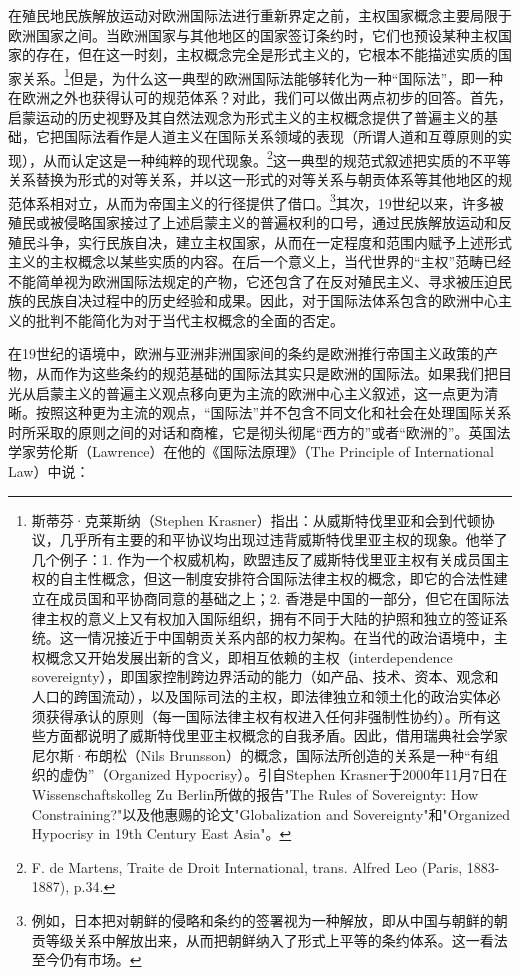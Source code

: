 \documentclass[a4paper, 12pt, openright]{ctexbook}
\begin{document}
在殖民地民族解放运动对欧洲国际法进行重新界定之前，主权国家概念主要局限于欧洲国家之间。当欧洲国家与其他地区的国家签订条约时，它们也预设某种主权国家的存在，但在这一时刻，主权概念完全是形式主义的，它根本不能描述实质的国家关系。\footnote{斯蒂芬·克莱斯纳（Stephen Krasner）指出：从威斯特伐里亚和会到代顿协议，几乎所有主要的和平协议均出现过违背威斯特伐里亚主权的现象。他举了几个例子：1. 作为一个权威机构，欧盟违反了威斯特伐里亚主权有关成员国主权的自主性概念，但这一制度安排符合国际法律主权的概念，即它的合法性建立在成员国和平协商同意的基础之上；2. 香港是中国的一部分，但它在国际法律主权的意义上又有权加入国际组织，拥有不同于大陆的护照和独立的签证系统。这一情况接近于中国朝贡关系内部的权力架构。在当代的政治语境中，主权概念又开始发展出新的含义，即相互依赖的主权（interdependence sovereignty），即国家控制跨边界活动的能力（如产品、技术、资本、观念和人口的跨国流动），以及国际司法的主权，即法律独立和领土化的政治实体必须获得承认的原则（每一国际法律主权有权进入任何非强制性协约）。所有这些方面都说明了威斯特伐里亚主权概念的自我矛盾。因此，借用瑞典社会学家尼尔斯·布朗松（Nils Brunsson）的概念，国际法所创造的关系是一种“有组织的虚伪”（Organized Hypocrisy）。引自Stephen Krasner于2000年11月7日在Wissenschaftskolleg Zu Berlin所做的报告"The Rules of Sovereignty: How Constraining?"以及他惠赐的论文"Globalization and Sovereignty"和"Organized Hypocrisy in 19th Century East Asia"。}但是，为什么这一典型的欧洲国际法能够转化为一种“国际法”，即一种在欧洲之外也获得认可的规范体系？对此，我们可以做出两点初步的回答。首先，启蒙运动的历史视野及其自然法观念为形式主义的主权概念提供了普遍主义的基础，它把国际法看作是人道主义在国际关系领域的表现（所谓人道和互尊原则的实现），从而认定这是一种纯粹的现代现象。\footnote{F. de Martens, Traite de Droit International, trans. Alfred Leo (Paris, 1883-1887), p.34.}这一典型的规范式叙述把实质的不平等关系替换为形式的对等关系，并以这一形式的对等关系与朝贡体系等其他地区的规范体系相对立，从而为帝国主义的行径提供了借口。\footnote{例如，日本把对朝鲜的侵略和条约的签署视为一种解放，即从中国与朝鲜的朝贡等级关系中解放出来，从而把朝鲜纳入了形式上平等的条约体系。这一看法至今仍有市场。}其次，19世纪以来，许多被殖民或被侵略国家接过了上述启蒙主义的普遍权利的口号，通过民族解放运动和反殖民斗争，实行民族自决，建立主权国家，从而在一定程度和范围内赋予上述形式主义的主权概念以某些实质的内容。在后一个意义上，当代世界的“主权”范畴已经不能简单视为欧洲国际法规定的产物，它还包含了在反对殖民主义、寻求被压迫民族的民族自决过程中的历史经验和成果。因此，对于国际法体系包含的欧洲中心主义的批判不能简化为对于当代主权概念的全面的否定。

在19世纪的语境中，欧洲与亚洲非洲国家间的条约是欧洲推行帝国主义政策的产物，从而作为这些条约的规范基础的国际法其实只是欧洲的国际法。如果我们把目光从启蒙主义的普遍主义观点移向更为主流的欧洲中心主义叙述，这一点更为清晰。按照这种更为主流的观点，“国际法”并不包含不同文化和社会在处理国际关系时所采取的原则之间的对话和商榷，它是彻头彻尾“西方的”或者“欧洲的”。英国法学家劳伦斯（Lawrence）在他的《国际法原理》（The Principle of International Law）中说：
\end{document}
